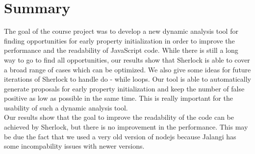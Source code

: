 \section{Summary}
The goal of the course project was to develop a new dynamic analysis tool for finding opportunities for early property initialization in order to improve the performance and the readability of JavaScript code. While there is still a long way to go to find all opportunities, our results show that Sherlock is able to cover a broad range of cases which can be optimized. We also give some ideas for future iterations of Sherlock to handle do - while loops. Our tool is able to automatically generate proposals for early property initialization and keep the number of false positive as low as possible in the same time. This is really important for the usability of such a dynamic analysis tool.\\ Our results show that the goal to improve the readability of the code can be achieved by Sherlock, but there is no improvement in the performance. This may be due the fact that we used a very old version of nodejs because Jalangi has some incompability issues with newer versions.  


\label{sec:summary}